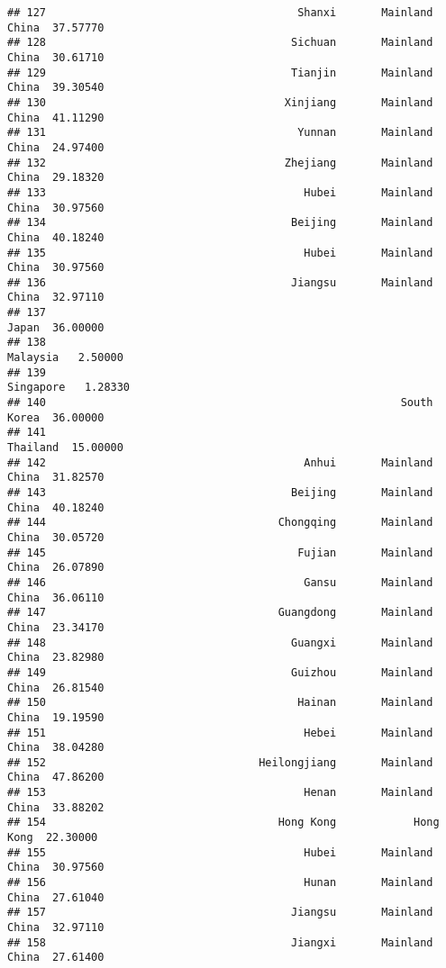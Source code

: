 \documentclass[
]{article}
\begin{document}
\begin{verbatim}
## 127                                       Shanxi       Mainland China  37.57770
## 128                                      Sichuan       Mainland China  30.61710
## 129                                      Tianjin       Mainland China  39.30540
## 130                                     Xinjiang       Mainland China  41.11290
## 131                                       Yunnan       Mainland China  24.97400
## 132                                     Zhejiang       Mainland China  29.18320
## 133                                        Hubei       Mainland China  30.97560
## 134                                      Beijing       Mainland China  40.18240
## 135                                        Hubei       Mainland China  30.97560
## 136                                      Jiangsu       Mainland China  32.97110
## 137                                                             Japan  36.00000
## 138                                                          Malaysia   2.50000
## 139                                                         Singapore   1.28330
## 140                                                       South Korea  36.00000
## 141                                                          Thailand  15.00000
## 142                                        Anhui       Mainland China  31.82570
## 143                                      Beijing       Mainland China  40.18240
## 144                                    Chongqing       Mainland China  30.05720
## 145                                       Fujian       Mainland China  26.07890
## 146                                        Gansu       Mainland China  36.06110
## 147                                    Guangdong       Mainland China  23.34170
## 148                                      Guangxi       Mainland China  23.82980
## 149                                      Guizhou       Mainland China  26.81540
## 150                                       Hainan       Mainland China  19.19590
## 151                                        Hebei       Mainland China  38.04280
## 152                                 Heilongjiang       Mainland China  47.86200
## 153                                        Henan       Mainland China  33.88202
## 154                                    Hong Kong            Hong Kong  22.30000
## 155                                        Hubei       Mainland China  30.97560
## 156                                        Hunan       Mainland China  27.61040
## 157                                      Jiangsu       Mainland China  32.97110
## 158                                      Jiangxi       Mainland China  27.61400

\end{verbatim}
\end{document}
